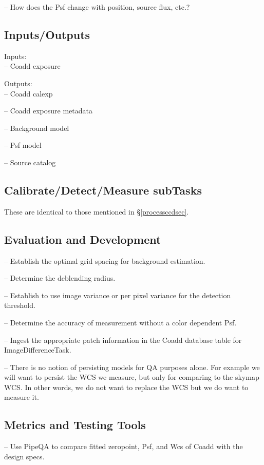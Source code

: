 \documentclass[12pt]{article}
\begin{document}
-- How does the Psf change with position, source flux, etc.?

\subsection{Inputs/Outputs}

Inputs: \\
-- Coadd exposure

Outputs:\\
-- Coadd calexp

-- Coadd exposure metadata

-- Background model

-- Psf model

-- Source catalog

\subsection{Calibrate/Detect/Measure subTasks}
These are identical to those mentioned in \S \ref{processccdsec}.

\subsection{Evaluation and Development}

-- Establish the optimal grid spacing for background estimation.

-- Determine the deblending radius.

-- Establish to use image variance or per pixel variance for the detection threshold.

-- Determine the accuracy of measurement without a color dependent Psf.

-- Ingest the appropriate patch information in the Coadd database table for ImageDifferenceTask.

-- There is no notion of persisting models for QA purposes alone.  For example we will want to persist
the WCS we measure, but only for comparing to the skymap WCS.  In other words, we do not want to replace the 
WCS but we do want to measure it.  

\subsection{Metrics and Testing Tools}

-- Use PipeQA to compare fitted zeropoint, Psf, and Wcs of Coadd with the design specs.

\end{document}
